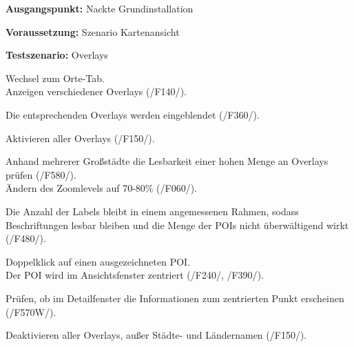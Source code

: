 \documentclass[10pt]{scrreprt}
\newcommand{\sfbf}[1]{\textbf{\sffamily #1}}
\newcommand{\ziel}[1]{{\fontsize{9.5}{11}\textsf{/#1/}}}
\newcommand{\ziellabel}{Z}
\newcommand{\muss}{\renewcommand{\labelenumi}{\textbf{\ziel{\ziellabel\numprint{\theenumi}0}}}}
\newcommand{\wunsch}{\renewcommand{\labelenumi}{\textbf{\ziel{\ziellabel\numprint{\theenumi}0W}}}}
\newenvironment{details}[1][6pt]{%
  \parskip#1 \parindent6mm \raggedright%
  \def\item{\par\ignorespaces\hangindent=5mm \hangafter1}}{%
  \par\ignorespaces}
\begin{document}
\vspace{1.0cm}
\begin{details}[2pt]
\item \sfbf{Ausgangspunkt:} Nackte Grundinstallation 
\item \sfbf{Voraussetzung:} Szenario Kartenansicht
\item \sfbf{Testszenario:} Overlays
\end{details}
\vspace{2mm}
\begin{enumerate}[leftmargin = 2.2cm, resume]
\item Wechsel zum Orte-Tab.\\Anzeigen verschiedener Overlays (\ziel{F140}).
\item Die entsprechenden Overlays werden eingeblendet (\ziel{F360}).
\item Aktivieren aller Overlays (\ziel{F150}).
\item Anhand mehrerer Großstädte die Lesbarkeit einer hohen Menge an Overlays prüfen (\ziel{F580}).\\Ändern des Zoomlevels auf 70-80\% (\ziel{F060}).
\item Die Anzahl der Labels bleibt in einem angemessenen Rahmen, sodass Beschriftungen lesbar bleiben und die Menge der POIs nicht überwältigend wirkt (\ziel{F480}).
\item Doppelklick auf einen ausgezeichneten POI.\\Der POI wird im Ansichtsfenster zentriert (\ziel{F240}, \ziel{F390}).
\wunsch
\item Prüfen, ob im Detailfenster die Informationen zum zentrierten Punkt erscheinen (\ziel{F570W}).
\muss
\item Deaktivieren aller Overlays, außer Städte- und Ländernamen (\ziel{F150}).
\end{enumerate}
\end{document}
